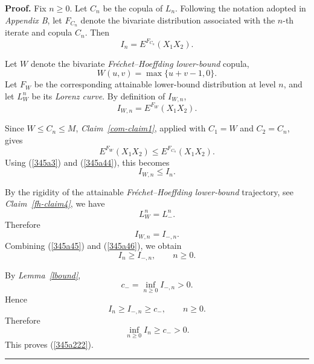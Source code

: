 \documentclass[onecolumn]{article}
\newenvironment{proof}[1][Proof]{\noindent\textbf{#1.} }{\ \rule{0.5em}{0.5em}}
\begin{document}
\begin{proof}
Fix $n\geq 0$. Let $C_{n}$ be the copula of $L_{n}$. Following the notation
adopted in \textit{Appendix B}, let $F_{C_{n}}$ denote the bivariate
distribution associated with the $n$-th iterate and copula $C_{n}$. Then 
\begin{equation}
I_{n}=E^{F_{C_{n}}}(X_{1}X_{2}).  \label{345a3}
\end{equation}

Let $W$ denote the bivariate \textit{Fr\'{e}chet--Hoeffding lower-bound}
copula, 
\begin{equation}
W(u,v)=\max \{u+v-1,0\}.  \label{345a3a}
\end{equation}%
Let $F_{W}$ be the corresponding attainable lower-bound distribution at
level $n$, and let $L_{W}^{n}$ be its \textit{Lorenz curve}. By definition
of $I_{W,n}$, 
\begin{equation}
I_{W,n}=E^{F_{W}}(X_{1}X_{2}).  \label{345a44}
\end{equation}

Since $W\leq C_{n}\leq M$, \textit{Claim~\ref{com-claim1}}, applied with $%
C_{1}=W$ and $C_{2}=C_{n}$, gives 
\begin{equation}
E^{F_{W}}(X_{1}X_{2})\leq E^{F_{C_{n}}}(X_{1}X_{2}).  \label{345a4}
\end{equation}%
Using (\ref{345a3}) and (\ref{345a44}), this becomes 
\begin{equation}
I_{W,n}\leq I_{n}.  \label{345a45}
\end{equation}

By the rigidity of the attainable \textit{Fr\'{e}chet--Hoeffding lower-bound}
trajectory, see \textit{Claim~\ref{fh-claim4}}, we have 
\begin{equation}
L_{W}^{n}=L_{-}^{n}.  \label{345a45a}
\end{equation}%
Therefore 
\begin{equation}
I_{W,n}=I_{-,n}.  \label{345a46}
\end{equation}%
Combining (\ref{345a45}) and (\ref{345a46}), we obtain 
\begin{equation}
I_{n}\geq I_{-,n},\qquad n\geq 0.  \label{345a47}
\end{equation}

By \textit{Lemma~\ref{lbound}}, 
\begin{equation}
c_{-}=\inf_{n\geq 0}I_{-,n}>0.  \label{345a47a}
\end{equation}%
Hence 
\begin{equation}
I_{n}\geq I_{-,n}\geq c_{-},\qquad n\geq 0.  \label{345a47b}
\end{equation}%
Therefore 
\begin{equation}
\inf_{n\geq 0}I_{n}\geq c_{-}>0.  \label{345a47c}
\end{equation}%
This proves (\ref{345a222}).
\end{proof}
\end{document}
